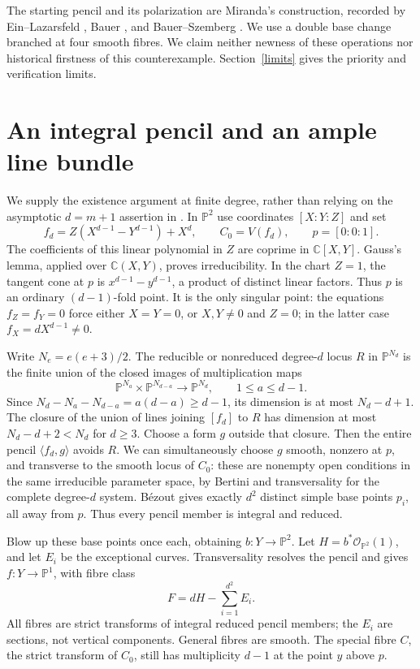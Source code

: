 \documentclass[11pt]{article}
\newcommand{\PP}{\mathbb P}
\newcommand{\CC}{\mathbb C}
\begin{document}
The starting pencil and its polarization are Miranda's construction,
recorded by Ein--Lazarsfeld \cite[Example~3.1, p.~182]{EL}, Bauer
\cite[Proposition~3.3 and its proof]{Bauer}, and Bauer--Szemberg
\cite[Proposition~2.1, p.~2]{Adjoint}. We use a double base change branched
at four smooth fibres. We claim neither newness of these operations nor
historical firstness of this counterexample. Section~\ref{limits} gives the
priority and verification limits.

\section{An integral pencil and an ample line bundle}
We supply the existence argument at finite degree, rather than relying on
the asymptotic $d=m+1$ assertion in \cite[Proposition~3.3(b)]{Bauer}.
In $\PP^2$ use coordinates $[X:Y:Z]$ and set
\[
 f_d=Z(X^{d-1}-Y^{d-1})+X^d,\qquad C_0=V(f_d),\qquad p=[0:0:1].
\]
The coefficients of this linear polynomial in $Z$ are coprime in
$\CC[X,Y]$. Gauss's lemma, applied over $\CC(X,Y)$, proves irreducibility.
In the chart $Z=1$, the tangent cone at $p$ is $x^{d-1}-y^{d-1}$, a product
of distinct linear factors. Thus $p$ is an ordinary $(d-1)$-fold point.
It is the only singular point: the equations $f_Z=f_Y=0$ force either
$X=Y=0$, or $X,Y\ne0$ and $Z=0$; in the latter case $f_X=dX^{d-1}\ne0$.

Write $N_e=e(e+3)/2$. The reducible or nonreduced degree-$d$ locus $R$ in
$\PP^{N_d}$ is the finite union of the closed images of multiplication maps
\[
 \PP^{N_a}\times\PP^{N_{d-a}}\longrightarrow\PP^{N_d},
       \qquad 1\le a\le d-1.
\]
Since $N_d-N_a-N_{d-a}=a(d-a)\ge d-1$, its dimension is at most
$N_d-d+1$. The closure of the union of lines joining $[f_d]$ to $R$ has
dimension at most $N_d-d+2<N_d$ for $d\ge3$. Choose a form $g$ outside that
closure. Then the entire pencil $\langle f_d,g\rangle$ avoids $R$.
We can simultaneously choose $g$ smooth, nonzero at $p$, and transverse to
the smooth locus of $C_0$: these are nonempty open conditions in the same
irreducible parameter space, by Bertini and transversality for the complete
degree-$d$ system. B\'ezout gives exactly $d^2$ distinct simple base points
$p_i$, all away from $p$. Thus every pencil member is integral and reduced.

Blow up these base points once each, obtaining $b:Y\to\PP^2$. Let
$H=b^*\mathcal O_{\PP^2}(1)$, and let $E_i$ be the exceptional curves.
Transversality resolves the pencil and gives $f:Y\to\PP^1$, with fibre class
\[
 F=dH-\sum_{i=1}^{d^2}E_i.
\]
All fibres are strict transforms of integral reduced pencil members; the
$E_i$ are sections, not vertical components. General fibres are smooth.
The special fibre $C$, the strict transform of $C_0$, still has multiplicity
$d-1$ at the point $y$ above $p$.
\end{document}
